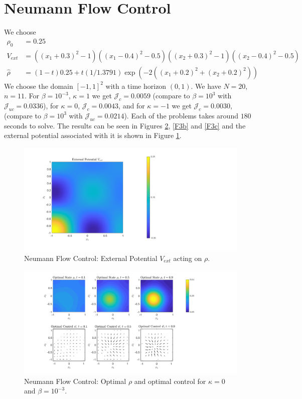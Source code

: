 \documentclass[11pt, a4paper]{article}
\theoremstyle{definition}
\newcommand{\hr}{\widehat \rho}
\begin{document}
	\section{Neumann Flow Control}
	We choose 
	\begin{align*}
		\rho_0 &= 0.25\\
		V_{ext} &= ((x_1 + 0.3)^2 - 1)((x_1-0.4)^2 - 0.5)
		((x_2 + 0.3)^2 - 1)((x_2-0.4)^2 - 0.5)\\
		\hr &= (1-t)0.25 + t(1/1.3791)\exp{(-2((x_1+0.2)^2 + (x_2+0.2)^2))}
	\end{align*}
	We choose the domain $[-1,1]^2$ with a time horizon $(0,1)$. We have $N = 20$, $n = 11$. 
	For $\beta = 10^{-3}$, $\kappa = 1$ we get $\mathcal J_c = 0.0059$ (compare to $\beta = 10^3$ with $\mathcal J_{uc} = 0.0336$), for $\kappa = 0$, $\mathcal J_c = 0.0043$, and for $\kappa = - 1$ we get $\mathcal J_c = 0.0030$, (compare to $\beta = 10^3$ with $\mathcal J_{uc} = 0.0214$). Each of the problems takes around $180$ seconds to solve. The results can be seen in Figures \ref{F3a}, \ref{F3b} and \ref{F3c} and the external potential associated with it is shown in Figure \ref{F3V}.
	\begin{figure}[h]
		\centering
		\includegraphics[scale=0.35]{FcEx1Vext.png}
		\caption{Neumann Flow Control: External Potential $V_{ext}$ acting on $\rho$.} 
		\label{F3V}
	\end{figure}
	\begin{figure}[h]
		\centering
		\includegraphics[scale=0.35]{FcEx1k0.png}
		\caption{Neumann Flow Control: Optimal $\rho$ and optimal control for $\kappa = 0$ and $\beta = 10^{-3}$.} 
		\label{F3a}
	\end{figure}
\end{document}
